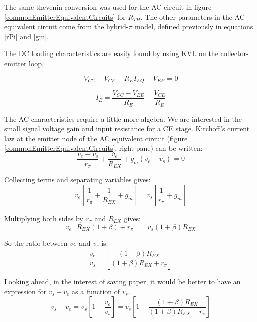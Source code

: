 \documentclass[titlepage, letterpaper, 11pt]{article}
\begin{document}
The same thevenin conversion was used for the AC circuit in figure
\ref{commonEmitterEquivalentCircuits} for $R_{TH}$. The other
parameters in the AC equivalent circuit come from the hybrid-$\pi$
model, defined previously in equations \ref{rPi} and \ref{gm}.

The DC loading characteristics are easily found by using KVL on the
collector-emitter loop.

\begin{equation*}
V_{CC}-V_{CE}-R_{E}I_{EQ}-V_{EE}=0
\end{equation*}

\begin{equation}
I_{E}=\frac{V_{CC}-V_{EE}}{R_{E}}-\frac{V_{CE}}{R_{E}}
\label{ceDCloadEquation}
\end{equation}

The AC characteristics require a little more algebra. We are
interested in the small signal voltage gain and input resistance
for a CE stage. Kirchoff's current law at the emitter node of the 
AC equivalent circuit (figure \ref{commonEmitterEquivalentCircuits},
right pane) can be written:
\begin{equation*}
\frac{v_{e}-v_{s}}{r_{\pi}}+\frac{v_{e}}{R_{EX}}+g_{m}(v_{e}-v_{s})=0
\end{equation*}

Collecting terms and separating variables gives:
\begin{equation*}
v_{e}\left[\frac{1}{r_{\pi}}+\frac{1}{R_{EX}}+g_{m}\right]
=v_{s}\left[\frac{1}{r_{\pi}}+g_{m}\right]
\end{equation*}

Multiplying both sides by $r_{\pi}$ and $R_{EX}$ gives:
\begin{equation*}
v_{e}[R_{EX}(1+\beta)+r_{\pi}]=v_{s}(1+\beta)R_{EX}
\end{equation*}

So the ratio between $v{e}$ and $v_{s}$ is:
\begin{equation*}
\frac{v_{e}}{v_{s}}=
\left[\frac{(1+\beta)R_{EX}}{(1+\beta)R_{EX}+r_{\pi}}\right]
\end{equation*}

Looking ahead, in the interest of saving paper, it would be better
to have an expression for $v_{s}-v_{e}$ as a function of $v_{s}$.
\begin{equation*}
v_{s}-v_{e}=
v_{s}\left[1-\frac{v_{e}}{v_{s}}\right]=
v_{s}\left[1-\frac{(1+\beta)R_{EX}}{(1+\beta)R_{EX}+r_{\pi}}\right]
\end{equation*}
\end{document}
